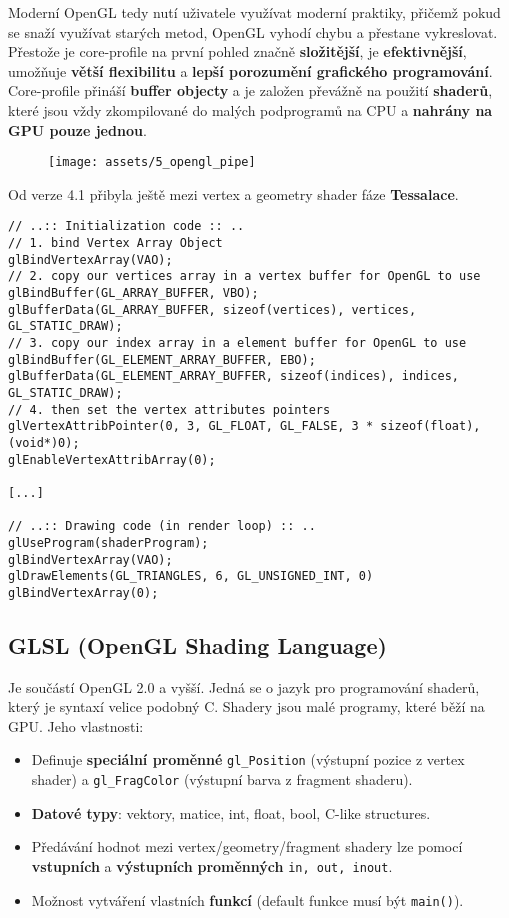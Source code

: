 Moderní OpenGL tedy nutí uživatele využívat moderní praktiky, přičemž pokud se snaží využívat starých metod, OpenGL vyhodí chybu a přestane vykreslovat. Přestože je core-profile na první pohled značně \textbf{složitější}, je \textbf{efektivnější}, umožňuje \textbf{větší flexibilitu} a \textbf{lepší porozumění grafického programování}. Core-profile přináší \textbf{buffer objecty} a je založen převážně na použití \textbf{shaderů}, které jsou vždy zkompilované do malých podprogramů na CPU a \textbf{nahrány na GPU pouze jednou}.

\begin{figure}[H]
    \centering
    \texttt{[image: assets/5\_opengl\_pipe]}
\end{figure}

Od verze 4.1 přibyla ještě mezi vertex a geometry shader fáze \textbf{Tessalace}.

\begin{verbatim}
// ..:: Initialization code :: ..
// 1. bind Vertex Array Object
glBindVertexArray(VAO);
// 2. copy our vertices array in a vertex buffer for OpenGL to use
glBindBuffer(GL_ARRAY_BUFFER, VBO);
glBufferData(GL_ARRAY_BUFFER, sizeof(vertices), vertices, GL_STATIC_DRAW);
// 3. copy our index array in a element buffer for OpenGL to use
glBindBuffer(GL_ELEMENT_ARRAY_BUFFER, EBO);
glBufferData(GL_ELEMENT_ARRAY_BUFFER, sizeof(indices), indices, GL_STATIC_DRAW);
// 4. then set the vertex attributes pointers
glVertexAttribPointer(0, 3, GL_FLOAT, GL_FALSE, 3 * sizeof(float), (void*)0);
glEnableVertexAttribArray(0);  

[...]

// ..:: Drawing code (in render loop) :: ..
glUseProgram(shaderProgram);
glBindVertexArray(VAO);
glDrawElements(GL_TRIANGLES, 6, GL_UNSIGNED_INT, 0)
glBindVertexArray(0);
\end{verbatim}

\subsection{GLSL (OpenGL Shading Language)}
Je součástí OpenGL 2.0 a vyšší. Jedná se o jazyk pro programování shaderů, který je syntaxí velice podobný C. Shadery jsou malé programy, které běží na GPU. Jeho vlastnosti:
\begin{itemize}
    \item Definuje \textbf{speciální proměnné} \texttt{gl\_Position} (výstupní pozice z vertex shader) a \texttt{gl\_FragColor} (výstupní barva z fragment shaderu).
    \item \textbf{Datové typy}: vektory, matice, int, float, bool, C-like structures.
    \item Předávání hodnot mezi vertex/geometry/fragment shadery lze pomocí \textbf{vstupních} a \textbf{výstupních} \textbf{proměnných} \texttt{in, out, inout}.
    \item Možnost vytváření vlastních \textbf{funkcí} (default funkce musí být \texttt{main()}).
\end{itemize}




